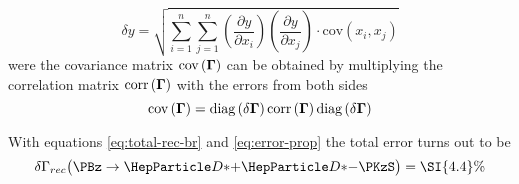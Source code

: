 \documentclass[a4paper]{report}
\begin{document}
\begin{equation}
    \delta y =\sqrt{\sum_{i=1}^{n}\sum_{j=1}^n\left(\frac{\partial
    y}{\partial x_i}\right)\left(\frac{\partial y}{\partial x_j}\right)\cdot
    \text{cov}(x_i, x_j)}
    \label{eq:error-prop}
\end{equation}
were the covariance matrix $\text{cov}\left(\mathbf{\Gamma}\right)$
can be obtained by multiplying the correlation matrix
$\text{corr}\left(\mathbf{\Gamma}\right)$ with the errors from both
sides
\begin{equation}
    \text{cov}\left(\mathbf{\Gamma}\right) =
    \text{diag}\left(\delta \mathbf{\Gamma} \right)
    \text{corr}\left(\mathbf{\Gamma}\right)
    \text{diag}\left(\delta \mathbf{\Gamma} \right)
    \label{eq:corr-to-cov}
\end{equation}

With equations \ref{eq:total-rec-br} and \ref{eq:error-prop}  the total error turns out to be
\begin{equation}
    \delta \BR_{rec}\big(\ddk\big) = \SI{4.4}{\%}
    \label{eq:total-rec-br-err}
\end{equation}
\end{document}
